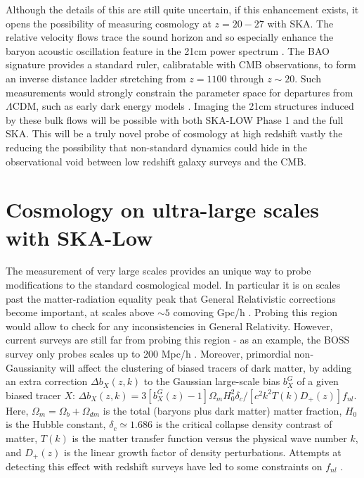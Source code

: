 \documentclass{PoS}
\newcommand{\om}{\Omega_m}
\newcommand{\ob}{\Omega_b}
\newcommand{\odm}{\Omega_{dm}}
\newcommand{\ho}{H_0}
\newcommand{\fnl}{f_{nl}}
\begin{document}
Although the details of this are still quite uncertain, if this enhancement exists, it opens the possibility of measuring cosmology at $z=20-27$ with SKA. The relative velocity flows trace the sound horizon and so especially enhance the baryon acoustic oscillation feature in the 21cm power spectrum \citep[see e.g.][]{2012ApJ...760....3M}. The BAO signature provides a standard ruler, calibratable with CMB observations, to form an inverse distance ladder stretching from $z=1100$ through $z\sim20$. Such measurements would strongly constrain the parameter space for departures from $\Lambda$CDM, such as early dark energy models \citep[e.g.][]{2006A&A...454...27B,2006JCAP...06..026D}. Imaging the 21cm structures induced by these bulk flows will be possible with both SKA-LOW Phase 1 and the full SKA. This will be a truly novel probe of cosmology at high redshift vastly the reducing the possibility that non-standard dynamics could hide in the observational void between low redshift galaxy surveys and the CMB.

\section{Cosmology on ultra-large scales with SKA-Low}

The measurement of very large scales provides an unique way to probe modifications to the standard cosmological model. In particular it is on scales past the matter-radiation equality peak that General Relativistic corrections become important, at scales above $\sim 5$ comoving Gpc/h \citep{2012PhRvD..85b3504J}. Probing this region would allow to check for any inconsistencies in General Relativity. However, current surveys are still far from probing this region - as an example, the BOSS survey only probes scales up to 200 Mpc/h \citep{2012MNRAS.427.3435A}.
Moreover, primordial non-Gaussianity will affect the clustering of biased tracers of dark matter, by adding an extra correction $\Delta b_X(z,k)$ to the Gaussian large-scale bias $b_X^G$ of a given biased tracer $X$: $\Delta b_X(z,k)=3[b_X^G(z)-1]\om\ho^2\delta_c/[c^2k^2T(k)D_+(z)]\fnl$. Here, $\om=\ob+\odm$ is the total (baryons plus dark matter) matter fraction, $\ho$ is the Hubble constant, $\delta_c\simeq1.686$ is the critical collapse density contrast of matter, $T(k)$ is the matter transfer function versus the physical wave number $k$, and $D_+(z)$ is the linear growth factor of density perturbations. Attempts at detecting this effect with redshift surveys have led to some constraints on $\fnl$ \citep{2014PhRvD..89b3511G}.
\end{document}

